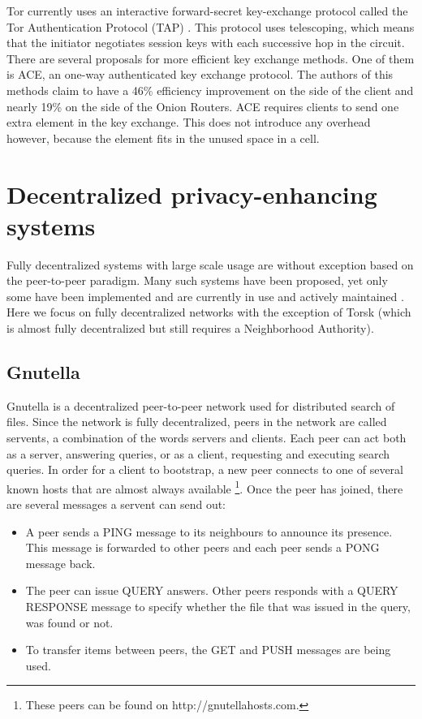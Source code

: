 \documentclass{article}
\begin{document}
		Tor currently uses an interactive forward-secret key-exchange protocol called the Tor Authentication Protocol (TAP) \cite{backes2012ace}. This protocol uses telescoping, which means that the initiator negotiates session keys with each successive hop in the circuit. There are several proposals for more efficient key exchange methods. One of them is ACE, an one-way authenticated key exchange protocol. The authors of this methods claim to have a 46\% efficiency improvement on the side of the client and nearly 19\% on the side of the Onion Routers. ACE requires clients to send one extra element in the key exchange. This does not introduce any overhead however, because the element fits in the unused space in a cell.

\section{Decentralized privacy-enhancing systems}
	\label{sec:decentralized}
	Fully decentralized systems with large scale usage are without exception based on the peer-to-peer paradigm. Many such systems have been proposed, yet only some have been implemented and are currently in use and actively maintained \cite{mislove2004ap3, rennhard2002introducing, panchenko2006nisan, rowstron2001pastry, nambiar2006salsa, freedman2002tarzan, ripeanu2001peer, androutsellis2004survey}. Here we focus on fully decentralized networks with the exception of Torsk (which is almost fully decentralized but still requires a Neighborhood Authority).

	\subsection{Gnutella} %
		Gnutella is a decentralized peer-to-peer network used for distributed search of files. Since the network is fully decentralized, peers in the network are called servents, a combination of the words servers and clients. Each peer can act both as a server, answering queries, or as a client, requesting and executing search queries. In order for a client to bootstrap, a new peer connects to one of several known hosts that are almost always available \footnote{These peers can be found on http://gnutellahosts.com.}. Once the peer has joined, there are several messages a servent can send out:
	
		\begin{itemize}
			\item A peer sends a PING message to its neighbours to announce its presence. This message is forwarded to other peers and each peer sends a PONG message back.
			\item The peer can issue QUERY answers. Other peers responds with a QUERY RESPONSE message to specify whether the file that was issued in the query, was found or not.
			\item To transfer items between peers, the GET and PUSH messages are being used.
		\end{itemize}
		
\end{document}
